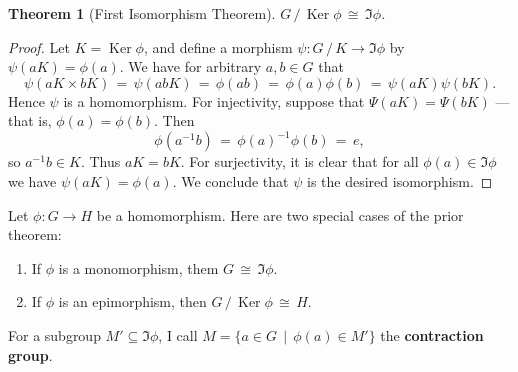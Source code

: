 \documentclass[11pt]{article}
\newtheorem{theorem}{Theorem}
\newcommand{\Ker}{\operatorname{Ker}}
\begin{document}
\begin{adjustwidth}{0.5cm}{}
  \begin{theorem}[First Isomorphism Theorem]
     $G \, / \, \Ker \phi \, \cong \, \Im \phi$.
  \end{theorem}
  \begin{proof}
    Let $K = \Ker \phi$, and define a morphism $\psi : G \, / \, K \to \Im \phi$ by $\psi(aK) = \phi(a)$. We have for arbitrary $a, b \in G$ that
    \[
      \psi(aK \times bK) \, = \, \psi(abK) \, = \, \phi(ab) \, = \, \phi(a) \phi(b) \, = \, \psi(aK) \psi(bK).
    \]
    Hence $\psi$ is a homomorphism. For injectivity, suppose that $\Psi(aK) = \Psi(bK)$ --- that is, $\phi(a) = \phi(b)$. Then
    \[
      \phi(a^{-1}b) \, = \, \phi(a)^{-1} \phi(b) \, = \, e,
    \]
    so $a^{-1}b \in K$. Thus $aK = bK$. For surjectivity, it is clear that for all $\phi(a) \in \Im \phi$ we have $\psi(aK) = \phi(a)$. We conclude that $\psi$ is the desired isomorphism.
  \end{proof}
\end{adjustwidth}

\newpage

Let $\phi : G \to H$ be a homomorphism. Here are two special cases of the prior theorem:
\begin{enumerate}
  \item If $\phi$ is a monomorphism, them $G \, \cong \, \Im \phi$.
  \item If $\phi$ is an epimorphism, then $G \, / \, \Ker \phi \, \cong \, H$.
\end{enumerate}

For a subgroup $M' \subseteq \Im \phi$, I call $M = \{ a \in G \, \mid \, \phi(a) \in M' \}$ the \textbf{contraction group}.
\end{document}
